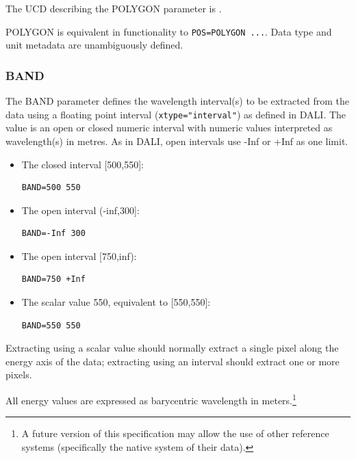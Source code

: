 \documentclass[11pt,a4paper]{ivoa}
\begin{document}
The UCD describing the POLYGON parameter is
.

POLYGON is equivalent in functionality to \texttt{POS=POLYGON ...}.  Data type  and unit metadata are unambiguously defined.


\subsubsection{BAND}
\label{sec:BAND}

The BAND parameter defines the wavelength interval(s) to be extracted from
the data using a floating point interval (\verb|xtype="interval"|) as
defined in DALI.  The value is an open or closed numeric
interval with numeric values interpreted as wavelength(s) in metres. As
in DALI, open intervals use -Inf or +Inf as one limit.

\begin{itemize}
\item The closed interval [500,550]:

\begin{lstlisting}
BAND=500 550
\end{lstlisting}

\item The open interval (-inf,300]:

\begin{lstlisting}
BAND=-Inf 300
\end{lstlisting}

\item The open interval [750,inf):

\begin{lstlisting}
BAND=750 +Inf
\end{lstlisting}

\item The scalar value 550, equivalent to [550,550]:

\begin{lstlisting}
BAND=550 550
\end{lstlisting}

\end{itemize}

Extracting using a scalar value should normally extract a
single pixel along the energy axis of the data; extracting
using an interval should extract one or more pixels.

All energy values are expressed as barycentric wavelength in
meters.\footnote{A future version of this specification may allow the
use of other reference systems (specifically the native
system of their data).}
\end{document}
